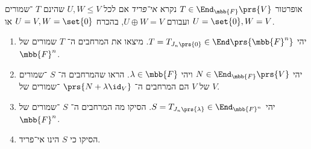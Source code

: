 \documentclass[a4paper,10pt,twoside,openany]{book}
\begin{document}
\begin{definition}
אופרטור
$T \in \End_{\mbb{F}}\prs{V}$
נקרא
\emph{אי־פריד}
אם לכל
$U,W \leq V$
שהינם
$T$%
־שמורים ועבורם
$U \oplus W = V$,
בהכרח
$U = V, W = \set{0}$
או
$U = \set{0}, W = V$.
\end{definition}

\begin{exercisechap}\label{exercise:jordan_invariant}
\begin{enumerate}
\item יהי
$T = T_{J_n\prs{0}} \in \End\prs{\mbb{F}^n}$.
מיצאו את המרחבים ה־%
$T$
שמורים של
$\mbb{F}^n$.

\item יהי
$N \in \End_{\mbb{F}}\prs{V}$
ויהי
$\lambda \in \mbb{F}$.
הראו שהמרחבים ה־%
$S$
־שמורים של
$V$
הם המרחבים ה־%
$\prs{N + \lambda \id_V}$
־שמורים של
$V$.

\item יהי
$S = T_{J_n\prs{\lambda}} \in \End_{\mbb{F}^n}$.
הסיקו מה המרחבים ה־%
$S$%
־שמורים של
$\mbb{F}^n$.

\item
הסיקו כי
$S$
הינו אי־פריד.
\end{enumerate}
\end{exercisechap}
\end{document}
